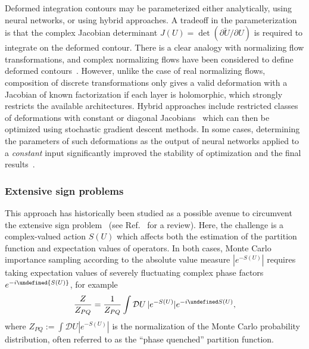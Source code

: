 \documentclass[12pt]{article}
\let\Im\undefined
\DeclareMathOperator{\Im}{Im}
\begin{document}
Deformed integration contours may be parameterized either analytically, using neural networks, or using hybrid approaches. A tradeoff in the parameterization is that the complex Jacobian determinant $J(U) = \det(\partial \tilde{U}/\partial U)$ is required to integrate on the deformed contour. There is a clear analogy with normalizing flow transformations, and complex normalizing flows have been considered to define deformed contours~\cite{Lawrence:2021izu}. However, unlike the case of real normalizing flows, composition of discrete transformations only gives a valid deformation with a Jacobian of known factorization if each layer is holomorphic, which strongly restricts the available architectures. Hybrid approaches include restricted classes of deformations with constant or diagonal Jacobians~\cite{Alexandru:2018brw,Alexandru:2018fqp,Alexandru:2018ddf,Detmold:2020ncp,Detmold:2021ulb,Rodekamp:2022xpf,Rodekamp:2023byu,Gantgen:2024nut} which can then be optimized using stochastic gradient descent methods. In some cases, determining the parameters of such deformations as the output of neural networks applied to a \emph{constant} input significantly improved the stability of optimization and the final results~\cite{Detmold:2023kjm}.


\subsubsection{Extensive sign problems}
This approach has historically been studied as a possible avenue to circumvent the extensive sign problem~\cite{Cristoforetti:2012su,Aarts:2013fpa,Cristoforetti:2013wha,Mukherjee:2013aga,Aarts:2014nxa,Cristoforetti:2014gsa,Alexandru:2015xva,Alexandru:2015sua,Alexandru:2016gsd,Fujii:2015vha,Tanizaki:2015rda,Alexandru:2017czx,Mori:2017nwj,Tanizaki:2017yow,Alexandru:2018brw,Alexandru:2018fqp,Kashiwa:2018vxr,Fukuma:2019uot,Fukuma:2019wbv,Kashiwa:2019lkv,Mou:2019gyl,Ulybyshev:2019fte,Lawrence:2021izu,Kanwar:2021tkd,Ihssen:2026njd} (see Ref.~\cite{Alexandru:2020wrj} for a review). Here, the challenge is a complex-valued action $S(U)$ which affects both the estimation of the partition function and expectation values of operators. In both cases, Monte Carlo importance sampling according to the absolute value measure $|e^{-S(U)}|$ requires taking expectation values of severely fluctuating complex phase factors $e^{-i \Im{S(U)}}$, for example
\begin{equation}
    \frac{Z}{Z_{PQ}} = \frac{1}{Z_{PQ}} \int \mathcal{D}U \, |e^{-S(U)}| e^{-i \Im S(U)},
\end{equation}
where $Z_{PQ} := \int \mathcal{D}U |e^{-S(U)}|$ is the normalization of the Monte Carlo probability distribution, often referred to as the ``phase quenched'' partition function.
\end{document}
